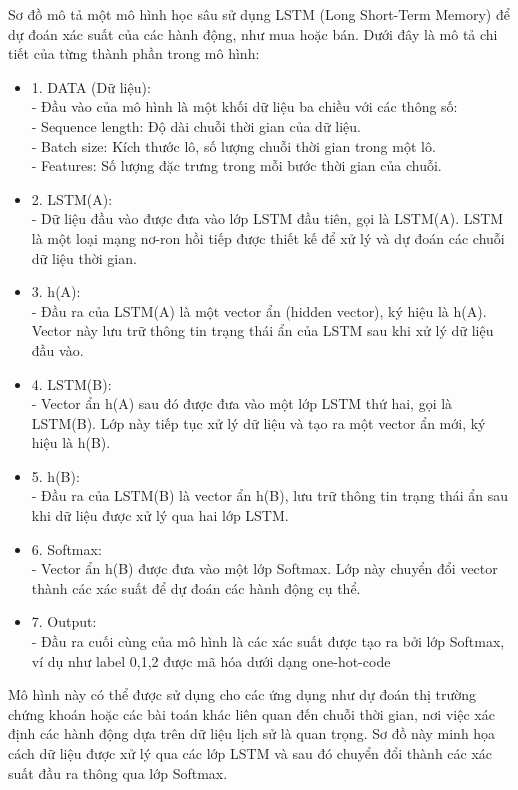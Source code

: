 Sơ đồ mô tả một mô hình học sâu sử dụng LSTM (Long Short-Term Memory) để dự đoán xác suất của các hành động, như mua hoặc bán. Dưới đây là mô tả chi tiết của từng thành phần trong mô hình:
\begin{itemize}
     

\item 1. DATA (Dữ liệu):\\
   - Đầu vào của mô hình là một khối dữ liệu ba chiều với các thông số:\\
     - Sequence length: Độ dài chuỗi thời gian của dữ liệu.\\
     - Batch size: Kích thước lô, số lượng chuỗi thời gian trong một lô.\\
     - Features: Số lượng đặc trưng trong mỗi bước thời gian của chuỗi.

\item 2. LSTM(A):\\
   - Dữ liệu đầu vào được đưa vào lớp LSTM đầu tiên, gọi là LSTM(A). LSTM là một loại mạng nơ-ron hồi tiếp được thiết kế để xử lý và dự đoán các chuỗi dữ liệu thời gian.

\item 3. h(A):\\
   - Đầu ra của LSTM(A) là một vector ẩn (hidden vector), ký hiệu là h(A). Vector này lưu trữ thông tin trạng thái ẩn của LSTM sau khi xử lý dữ liệu đầu vào.

\item 4. LSTM(B):\\
   - Vector ẩn h(A) sau đó được đưa vào một lớp LSTM thứ hai, gọi là LSTM(B). Lớp này tiếp tục xử lý dữ liệu và tạo ra một vector ẩn mới, ký hiệu là h(B).

\item 5. h(B):\\
   - Đầu ra của LSTM(B) là vector ẩn h(B), lưu trữ thông tin trạng thái ẩn sau khi dữ liệu được xử lý qua hai lớp LSTM.

\item 6. Softmax:\\
   - Vector ẩn h(B) được đưa vào một lớp Softmax. Lớp này chuyển đổi vector thành các xác suất để dự đoán các hành động cụ thể.

\item 7. Output:\\
   - Đầu ra cuối cùng của mô hình là các xác suất được tạo ra bởi lớp Softmax, ví dụ như label 0,1,2 được mã hóa dưới dạng one-hot-code

\end{itemize}
Mô hình này có thể được sử dụng cho các ứng dụng như dự đoán thị trường chứng khoán hoặc các bài toán khác liên quan đến chuỗi thời gian, nơi việc xác định các hành động dựa trên dữ liệu lịch sử là quan trọng. Sơ đồ này minh họa cách dữ liệu được xử lý qua các lớp LSTM và sau đó chuyển đổi thành các xác suất đầu ra thông qua lớp Softmax.


